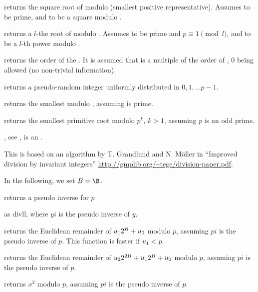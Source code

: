  returns the square root of 
modulo  (smallest positive representative). Assumes  to be
prime, and  to be a square modulo .

 returns a $l$-the root of 
modulo . Assumes  to be prime and $p \equiv 1 \pmod{l}$, and
 to be a $l$-th power modulo .

 returns the order of the
 . It is assumed that  is a multiple of the order of
, $0$ being allowed (no non-trivial information).

 returns a pseudo-random integer uniformly
distributed in $0, 1, \dots p-1$.

 returns the smallest 
modulo , assuming  is prime.

 returns the smallest primitive root modulo
$p^k$, $k > 1$, assuming $p$ is an odd prime.

, see ,
 is an .


This is based on an algorithm by T. Grandlund and N. M\"{o}ller in
``Improved division by invariant integers''
\url{http://gmplib.org/~tege/division-paper.pdf}.

In the following, we set $B=\B$.

 returns a pseudo inverse  for $p$

as divll, where $yi$ is the pseudo inverse of $y$.

 returns
the Euclidean remainder of $u_1\*2^B+u_0$ modulo $p$, assuming $pi$ is the
pseudo inverse of $p$.  This function is faster if $u_1 < p$.

returns the Euclidean remainder of $u_2\*2^{2\*B}+u_1\*2^{B}+u_0$ modulo $p$,
assuming $pi$ is the pseudo inverse of $p$.

 returns $x^2$ modulo $p$,
assuming $pi$ is the pseudo inverse of $p$.

